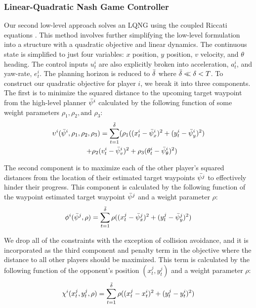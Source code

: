 \subsubsection{Linear-Quadratic Nash Game Controller}
Our second low-level approach solves an LQNG using the coupled Riccati equations \cite{basar}. This method involves further simplifying the low-level formulation into a structure with a quadratic objective and linear dynamics. The continuous state is simplified to just four variables: $x$ position, $y$ position, $v$ velocity, and $\theta$ heading. The control inputs $u^i_t$ are also explicitly broken into acceleration, $a^i_t$, and yaw-rate, $e^i_t$. The planning horizon is reduced to $\Bar{\delta}$ where $\Bar{\delta} \ll \delta < T$. To construct our quadratic objective for player $i$, we break it into three components. The first is to minimize the squared distance to the upcoming target waypoint from the high-level planner $\Bar{\psi}^i$ calculated by the following function of some weight parameters $\rho_1, \rho_2, \text{and } \rho_3$:
\begin{multline} \label{eq:lqng_obj1}
\upsilon^i(\Bar{\psi}^i, \rho_1, \rho_2,\rho_3) =  \sum_{t = 1}^{\Bar{\delta}} (\rho_1((x^i_{t} - \Bar{\psi}^i_x)^2 + (y^i_{t} - \Bar{\psi}^i_y)^2) \\   \quad + \rho_2 (v^i_{t} - \Bar{\psi}^i_v)^2 
 + \rho_3 (\theta^i_{t} - \Bar{\psi}^i_\theta)^2)
\end{multline}

The second component is to maximize each of the other player's squared distances from the location of their estimated target waypoints $\Bar{\psi^j}$ to effectively hinder their progress. This component is calculated by the following function of the waypoint estimated target waypoint $\Bar{\psi}^j$ and a weight parameter $\rho$:
\begin{equation} \label{eq:lqng_obj2}
    \phi^i(\Bar{\psi}^j, \rho) = \sum_{t = 1}^{\Bar{\delta}} \rho((x^j_{t} - \Bar{\psi}^j_x)^2 + (y^j_{t} - \Bar{\psi}^j_y)^2)
\end{equation}

We drop all of the constraints with the exception of collision avoidance, and it is incorporated as the third component and penalty term in the objective where the distance to all other players should be maximized. This term is calculated by the following function of the opponent's position $(x^j_t, y^j_t)$ and a weight parameter $\rho$:
\begin{equation} \label{eq:lqng_obj3}
    \chi^i(x^j_t, y^j_t, \rho) = \sum_{t = 1}^{\Bar{\delta}} \rho((x^j_{t} - x^i_{t})^2 + (y^j_{t} - y^i_{t})^2)
\end{equation}

